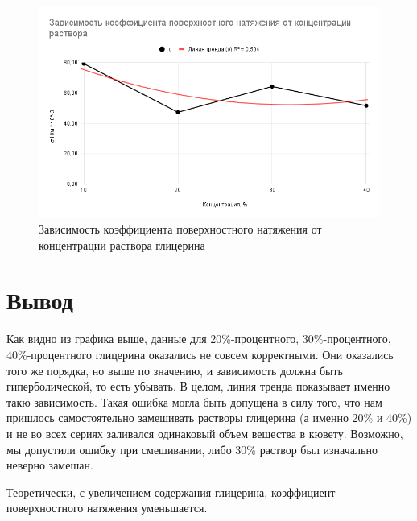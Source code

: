 \documentclass[a4paper,14pt]{article}
\begin{document}
\begin{figure}[!ht]
    \centering
    \includegraphics[scale=0.6]{sigma1.png}
    \caption{Зависимость коэффициента поверхностного натяжения от концентрации раствора глицерина} 
\end{figure}

\section{Вывод}
\hspace{\parindent}Как видно из графика выше, данные для 20\%-процентного, 30\%-процентного, 40\%-процентного глицерина оказались не совсем корректными. Они оказались того же порядка, но выше по значению, и зависимость должна быть гиперболической, то есть убывать. В целом, линия тренда показывает именно такю зависимость. Такая ошибка могла быть допущена в силу того, что нам пришлось самостоятельно замешивать растворы глицерина (а именно 20\% и 40\%) и не во всех сериях заливался одинаковый объем вещества в кювету. Возможно, мы допустили ошибку при смешивании, либо 30\% раствор был изначально неверно замешан. 

Теоретически, с увеличением содержания глицерина, коэффициент поверхностного натяжения уменьшается. 
\end{document}
